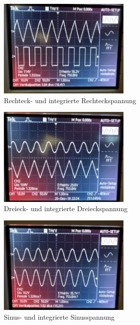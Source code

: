 \begin{figure}[h]
    \centering
    \includegraphics[width=6.5cm]{Rechteck.pdf}
     \caption{Rechteck- und integrierte Rechteckspannung}
    \label{fig:e}
\end{figure}
\begin{figure}[h]
    \centering
    \includegraphics[width=6.5cm]{Dreieck.pdf}
     \caption{Dreieck- und integrierte Dreieckspannung}
    \label{fig:f}
\end{figure}
\begin{figure}[h]
    \centering
    \includegraphics[width=6.5cm]{Sinus.pdf}
     \caption{Sinus- und integrierte Sinusspannung}
    \label{fig:g}
\end{figure}